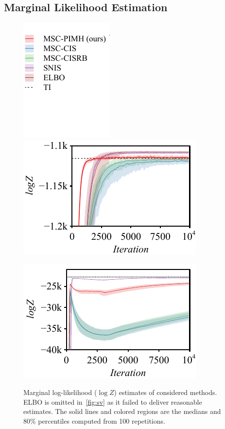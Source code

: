 \subsection{Marginal Likelihood Estimation}\label{section:mll}
%
\begin{figure}[H]
  \vspace{-0.1in}
  \centering
  \begin{minipage}[b]{0.17\linewidth}
    \centering
    \includegraphics[scale=0.75]{figures/radon_03.pdf}
  \end{minipage}
  \begin{minipage}[b]{0.35\linewidth}
    \centering
    \includegraphics[scale=0.7]{figures/radon_02.pdf}
  \end{minipage}
  \begin{minipage}[b]{0.35\linewidth}
    \centering
    \includegraphics[scale=0.7]{figures/sv_02.pdf}\label{fig:sv}
  \end{minipage}
  \caption{Marginal log-likelihood (\(\log Z\)) estimates of considered methods.
    ELBO is omitted in~\cref{fig:sv} as it failed to deliver reasonable estimates.
    The solid lines and colored regions are the medians and 80\% percentiles computed from 100 repetitions.
  }\label{fig:marginal_likelihood}
  \vspace{-0.15in}
\end{figure}
%

